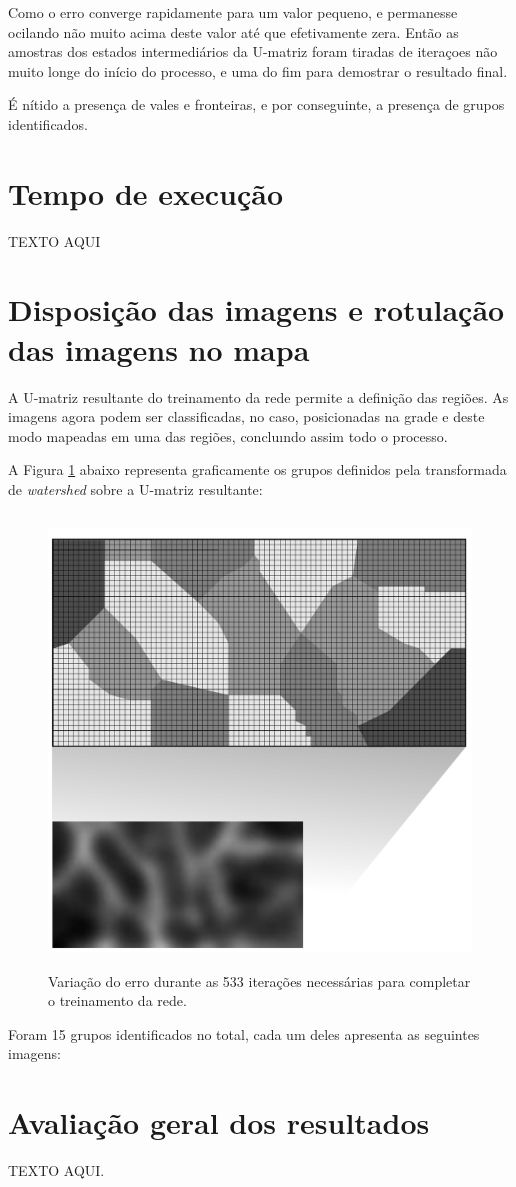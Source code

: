 Como o erro converge rapidamente para um valor pequeno, e permanesse ocilando
não muito acima deste valor até que efetivamente zera. Então as amostras dos
estados intermediários da U-matriz foram tiradas de iteraçoes não muito longe
do início do processo, e uma do fim para demostrar o resultado final.

É nítido a presença de vales e fronteiras, e por conseguinte, a presença de
grupos identificados.

\section{Tempo de execução}

TEXTO AQUI

\section{Disposição das imagens e rotulação das imagens no mapa}

A U-matriz resultante do treinamento da rede permite a definição das regiões.
As imagens agora podem ser classificadas, no caso, posicionadas na grade e
deste modo mapeadas em uma das regiões, concluındo assim todo o processo.

A Figura \ref{fig:grupos_final} abaixo representa graficamente os grupos
definidos pela transformada de \textit{watershed} sobre a U-matriz resultante:

\begin{figure}[H]
  \begin{center}
    \includegraphics[height=12cm]{imagens/grupos_final.pdf}
  \end{center}
  \caption{ Variação do erro durante as 533 iterações necessárias para completar
    o treinamento da rede.}
  \label{fig:grupos_final}
\end{figure}

Foram 15 grupos identificados no total, cada um deles apresenta as seguintes
imagens:

\section{Avaliação geral dos resultados}

TEXTO AQUI.
